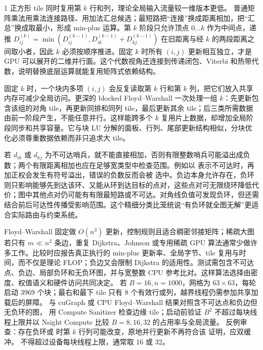 \begin{solutionexercise}{1}
\conclusionheading 正方形 tile 同时复用第 $k$ 行和列，理论全局输入流量较一维版本更低。
\discussionheading
{}普通矩阵乘法用乘法连接路径、用加法汇总候选；最短路把“连接”换成距离相加，把“汇总”换成取最小，形成 min-plus 运算。第 $k$ 阶段只允许顶点 $0\ldots k$ 作为中间点，递推 $D^{(k)}_{ij}=\min(D^{(k-1)}_{ij},D^{(k-1)}_{ik}+D^{(k-1)}_{kj})$ 在旧距离与经 $k$ 的两段距离之间取小者，因此 $k$ 必须按顺序推进。固定 $k$ 时所有 $(i,j)$ 更新相互独立，才是 GPU 可以展开的二维并行面。这个代数视角还连接到传递闭包、Viterbi 和热带代数，说明替换底层运算就能复用矩阵式依赖结构。

固定 $k$ 时，一个块内多项 $(i,j)$ 会反复读取第 $k$ 行和第 $k$ 列，把它们放入共享内存可减少全局访问。更深的 blocked Floyd--Warshall 一次处理一组 $k$：先更新包含该组的对角 tile，再更新同排和同列 tile，最后更新其余 tile；后三类所需数据由前一阶段产生，不能任意并行。这样能跨多个 $k$ 复用片上数据，却增加全局阶段同步和共享容量。它与块 LU 分解的面板、行列、尾部更新结构相似，分块优化必须尊重数据依赖而非只追求大 tile。

若 $d_{ik}$ 或 $d_{kj}$ 为不可达哨兵，就不能直接相加，否则有限整数哨兵可能溢出成负数；两个有限距离相加也应在足够宽类型中检查范围。例如以  表示不可达时，再加正权会发生有符号溢出，错误的负数反而会被  选中。负边本身允许存在，负环则只影响能够先到达该环、又能从环到达目标的点对，这些点对可无限绕环降低代价；图中其他点对仍可能有有限最短路或不可达。对角线负值可发现负环，但还需结合前后可达性传播受影响范围。这个精细分类比笼统说“有负环就全图无解”更适合实际路由与约束系统。

Floyd--Warshall 固定做 $O(n^3)$ 更新，控制规则且适合稠密邻接矩阵；稀疏大图若只有 $m\ll n^2$ 条边，重复 Dijkstra、Johnson 或专用稀疏 GPU 算法通常少做许多工作。比较时应报告真正执行的 min-plus 更新率、全局字节、tile 复用与时间，而不仅是理论 FLOP；负边又会限制 Dijkstra 的适用性。测试需包含不可达点、负边、局部负环和无负环图，并与宽整数 CPU 参考比对。这样算法选择由密度、权值语义和硬件访问共同决定。
\variantheading 若 $B=16,n=1000$，网格为 $63\times63$，每轮启动 3969 个块；最右和最下
tile 只有 8 个有效行或列，越界线程仍需参加共享加载后的屏障。
\practiceheading 与 cuGraph 或 CPU Floyd--Warshall 结果对照含不可达点和负边但无负环的图，
用 Compute Sanitizer 检查边缘 tile；启动前验证 $B^2$ 不超过每块线程上限并以 Nsight
Compute 比较 $B=8,16,32$ 的占用率与全局流量。
反例审查：存在负环或  时第 $k$ 行列可能改变，原地并行更新不再符合该
证明，应双缓冲。 不得超过设备每块线程上限，通常取 16 或 32。
\end{solutionexercise}

